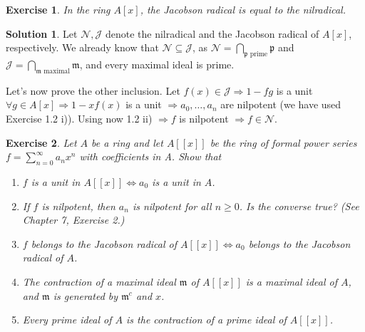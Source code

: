 \documentclass[12pt]{article}
\newcommand{\imp}{\ensuremath{\Rightarrow}}
\newtheorem{ex}{Exercise}[section]
\theoremstyle{definition}
\newtheorem*{sol}{Solution}
\begin{document}
\begin{ex}
	In the ring $A[x]$, the Jacobson radical is equal to the nilradical.
\end{ex}

\begin{sol}
	Let $\mathcal{N}, \mathcal{J}$ denote the nilradical and the Jacobson radical of $A[x]$, respectively. We already know that $ \mathcal{N} \subseteq \mathcal{J}$, as $\mathcal{N} = \bigcap\limits_{\mathfrak{p} \text{ prime}} \mathfrak{p}$ and $\mathcal{J} = \bigcap\limits_{\mathfrak{m} \text{ maximal}} \mathfrak{m}$, and every maximal ideal is prime.

	Let's now prove the other inclusion. Let $f(x) \in \mathcal{J} \imp 1-fg$ is a unit $\forall g \in A[x] \imp 1- xf(x)$ is a unit $\imp a_0, \dots, a_n$ are nilpotent (we have used Exercise 1.2 i)). Using now 1.2 ii) $\imp f$ is nilpotent $\imp f \in \mathcal{N}$.
\end{sol}

\begin{ex}
 Let $A$ be a ring and let $A[[x]]$ be the ring of formal power series $f = \sum\limits_{n = 0}^{\infty} a_nx^n$ with coefficients in A. Show that

 \begin{enumerate}[label=(\roman*)]
		\item $f$ is a unit in $A[[x]] \iff a_0$ is a unit in $A$.

		\item If $f$ is nilpotent, then $a_n$ is nilpotent for all $n \geq 0$. Is the converse true? (See Chapter 7, Exercise 2.)

		\item $f$ belongs to the Jacobson radical of $A[[x]] \iff a_0$ belongs to the Jacobson radical of $A$.

		\item The contraction of a maximal ideal $\mathfrak{m}$ of $A[[x]]$ is a maximal ideal of $A$, and $\mathfrak{m}$ is generated by $\mathfrak{m}^c$ and $x$.

		\item Every prime ideal of $A$ is the contraction of a prime ideal of $A[[x]]$.
\end{enumerate}
\end{ex}
\end{document}

